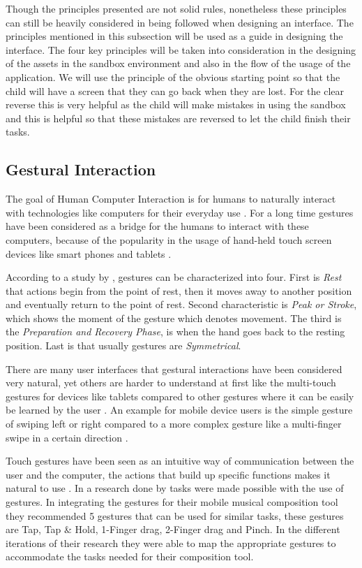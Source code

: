 Though the principles presented are not solid rules, nonetheless these principles can still be heavily considered in being followed when designing an interface. The principles mentioned in this subsection will be used as a guide in designing the interface. The four key principles will be taken into consideration in the designing of the assets in the sandbox environment and also in the flow of the usage of the application. We will use the principle of the obvious starting point so that the child will have a screen that they can go back when they are lost. For the clear reverse this is very helpful as the child will make mistakes in using the sandbox and this is helpful so that these mistakes are reversed to let the child finish their tasks. 

\subsection{Gestural Interaction}
The goal of Human Computer Interaction is for humans to naturally interact with technologies like computers for their everyday use \cite{hasan2012human,rautaray2015vision}. For a long time gestures have been considered as a bridge for the humans to interact with these computers, because of the popularity in the usage of hand-held touch screen devices like smart phones and tablets \cite{ruiz2011user,hasan2012human}.

According to a study by , gestures can be characterized into four. First is \textit{Rest} that actions begin from the point of rest, then it moves away to another position and eventually return to the point of rest. Second characteristic is \textit{Peak or Stroke}, which shows the moment of the gesture which denotes movement. The third is the \textit{Preparation and Recovery Phase}, is when the hand goes back to the resting position. Last is that usually gestures are \textit{Symmetrical}.

There are many user interfaces that gestural interactions have been considered very natural, yet others are harder to understand at first like the multi-touch gestures for devices like tablets compared to other gestures where it can be easily be learned by the user \cite{mortensen_2019}. An example for mobile device users is the simple gesture of swiping left or right compared to a more complex gesture like a multi-finger swipe in a certain direction \cite{mortensen_2019}.

Touch gestures have been seen as an intuitive way of communication between the user and the computer, the actions that build up specific functions makes it natural to use \cite{rautaray2015vision}. In a research done by  tasks were made possible with the use of gestures. In integrating the gestures for their mobile musical composition tool they recommended 5 gestures that can be used for similar tasks, these gestures are Tap, Tap & Hold, 1-Finger drag, 2-Finger drag and Pinch. In the different iterations of their research they were able to map the appropriate gestures to accommodate the tasks needed for their composition tool.  

